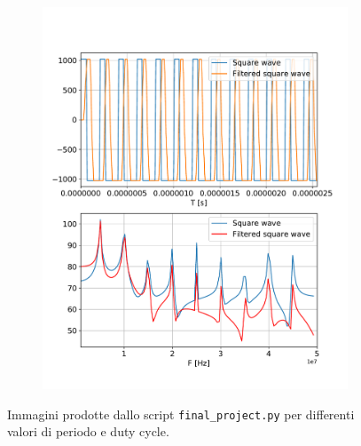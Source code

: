 \documentclass[a4paper,11pt]{article}
\begin{document}
\begin{figure}[H]
\begin{subfigure}{0.49\textwidth}
      \includegraphics[width=1\linewidth]{./Figure/P20_D30.pdf}
    \end{subfigure}
    \caption{Immagini prodotte dallo script \texttt{final\_project.py} per differenti valori di periodo e duty cycle.}
\end{figure}
\end{document}
